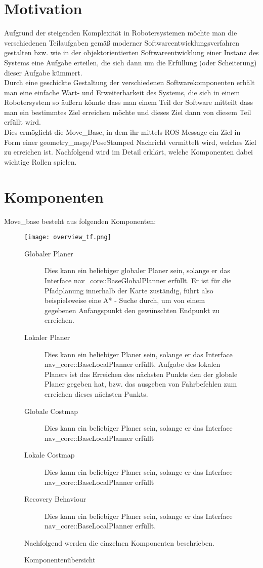 \documentclass[oribibl]{llncs}
\begin{document}
\section{Motivation}
Aufgrund der steigenden Komplexität in Robotersystemen möchte man die verschiedenen Teilaufgaben gemäß moderner Softwareentwicklungsverfahren gestalten bzw. wie in der objektorientierten Softwareentwicklung einer Instanz des Systems eine Aufgabe erteilen, die sich dann um die Erfüllung (oder Scheiterung) dieser Aufgabe kümmert.\\
Durch eine geschickte Gestaltung der verschiedenen Softwarekomponenten erhält man eine einfache Wart- und Erweiterbarkeit des Systems, die sich in einem Robotersystem so äußern könnte dass man einem Teil der Software mitteilt dass man ein bestimmtes Ziel erreichen möchte und dieses Ziel dann von diesem Teil erfüllt wird.\\
Dies ermöglicht die Move\_Base, in dem ihr mittels ROS-Message ein Ziel in Form einer geometry\_msgs/PoseStamped Nachricht vermittelt wird, welches Ziel zu erreichen ist. Nachfolgend wird im Detail erklärt, welche Komponenten dabei wichtige Rollen spielen.
\section{Komponenten}
Move\_base besteht aus folgenden Komponenten: \cite{moveBase}
\begin{figure}
	\centering
  \texttt{[image: overview\_tf.png]}
	\caption{Komponentenübersicht}
	\cite{moveBaseComponenents}
	\label{fig2}
\begin{description}	
\item[Globaler Planer]
Dies kann ein beliebiger globaler Planer sein, solange er das Interface nav\_core::BaseGlobalPlanner erfüllt. Er ist für die Pfadplanung innerhalb der Karte zuständig, führt also beispielsweise eine A* - Suche durch, um von einem gegebenen Anfangspunkt den gewünschten Endpunkt zu erreichen.
\item[Lokaler Planer]
Dies kann ein beliebiger Planer sein, solange er das Interface nav\_core::BaseLocalPlanner erfüllt. Aufgabe des lokalen Planers ist das Erreichen des nächsten Punkts den der globale Planer gegeben hat, bzw. das ausgeben von Fahrbefehlen zum erreichen dieses nächsten Punkts.
\item[Globale Costmap]
Dies kann ein beliebiger Planer sein, solange er das Interface nav\_core::BaseLocalPlanner erfüllt
\item[Lokale Costmap]
Dies kann ein beliebiger Planer sein, solange er das Interface nav\_core::BaseLocalPlanner erfüllt
\item[Recovery Behaviour]
Dies kann ein beliebiger Planer sein, solange er das Interface nav\_core::BaseLocalPlanner erfüllt.

\end{description}

Nachfolgend werden die einzelnen Komponenten beschrieben.
\end{figure}
\end{document}

